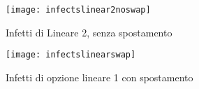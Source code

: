 \documentclass[a4paper]{article}
\begin{document}
\begin{figure}[!h]
	\centering
	\texttt{[image: infectslinear2noswap]}
	\caption[Infetti lineare 2 noSpostamento]{Infetti di Lineare 2, senza spostamento}
	
\end{figure}
\begin{figure}[!h]
	\centering
	\texttt{[image: infectslinearswap]}
	\caption[Infetti lineare 2 noSpostamento]{Infetti di opzione lineare 1 con spostamento}
	
\end{figure}
\end{document}
